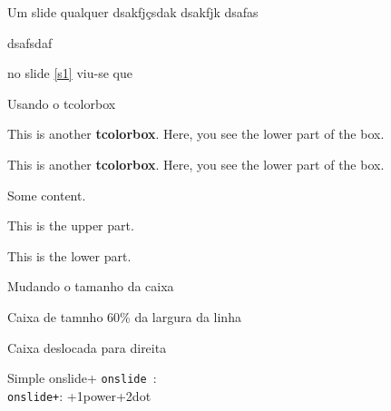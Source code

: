\begin{slide}[toc=]{Um slide qualquer}
dsakfjçsdak
dsakfjk
dsafas


dsafsdaf

no slide \ref{s1} viu-se que


\end{slide}


\begin{slide}{Usando o tcolorbox}
\begin{tcolorbox}
This is another \textbf{tcolorbox}.
\tcblower
Here, you see the lower part of the box.
\end{tcolorbox}

\begin{tcolorbox}[colback=red!5!white,colframe=red!75!black,title=Cabeçalho da caixa]
This is another \textbf{tcolorbox}.
\tcblower
Here, you see the lower part of the box.
\end{tcolorbox}

\end{slide}


\begin{slide}[toc=]{}
\begin{tcolorbox}[title=tese,colframe=red!75!black]
Some content.
\end{tcolorbox}

\end{slide}

\begin{slide}[toc=]{}
\begin{tcolorbox}[sidebyside,title=Lower separated]
This is the upper part.

\tcblower

This is the lower part.
\end{tcolorbox}
\end{slide}



\begin{slide}[toc=]{Mudando o tamanho da caixa}
\begin{flushright}
\begin{tcolorbox}[sidebyside,title=Lado a lado]
Caixa de tamnho 60\% da largura da linha 

\tcblower

Caixa deslocada para direita
\end{tcolorbox}  
\end{flushright}

\end{slide}

\begin{slide}{Simple onslide+}
\texttt{onslide }: \\
\texttt{onslide+}: \onslide+{1}{power}\onslide+{2}{dot}
\end{slide}
